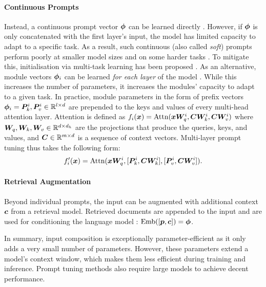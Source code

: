 \documentclass[10pt]{article} %
\begin{document}
\paragraph*{Continuous Prompts} Instead, a continuous prompt vector ${\bm{\phi}}$ can be learned directly  \citep{Lester2021prompttuning,liu2021gpt,zhong-etal-2021-factual,hambardzumyan-etal-2021-warp}. However, if ${\bm{\phi}}$ is only concatenated with the first layer's input, the model has limited capacity to adapt to a specific task. As a result, such continuous (also called \textit{soft}) prompts perform poorly at smaller model sizes and on some harder tasks \citep{Mahabadi2021Compacter,liu-etal-2022-p}. To mitigate this, initialisation via multi-task learning has been proposed \citep{Vu2022spot}. As an alternative, module vectors ${\bm{\phi}}_i$ can be learned \textit{for each layer} of the model \citep[Figure~\ref{fig:nature_modularity:input_composition}; ][]{Li2020PrefixTuning,liu-etal-2022-p}. While this increases the number of parameters, it increases the modules' capacity to adapt to a given task. In practice, module parameters in the form of prefix vectors ${\bm{\phi}}_i = {\bm{P}}_k^i, {\bm{P}}_v^i \in \mathbb{R}^{l \times d}$ are prepended to the keys and values of every multi-head attention layer. Attention is defined as $f_i({\bm{x}}) = \text{Attn}({\bm{x}} {\bm{W}}_q^i, {\bm{C}} {\bm{W}}_k^i, {\bm{C}} {\bm{W}}_v^i)$ where ${\bm{W}}_q, {\bm{W}}_k, {\bm{W}}_v \in \mathbb{R}^{d \times d_h}$ are the projections that produce the queries, keys, and values, and ${\bm{C}} \in \mathbb{R}^{m \times d}$ is a sequence of context vectors. Multi-layer prompt tuning thus takes the following form: 
\begin{equation}
    f_i^\prime({\bm{x}}) = \text{Attn}({\bm{x}} {\bm{W}}_q^i, [{\bm{P}}_k^i, {\bm{C}} {\bm{W}}_k^i], [{\bm{P}}_v^i, {\bm{C}} {\bm{W}}_v^i]).
\end{equation}

\paragraph*{Retrieval Augmentation} Beyond individual prompts, the input can be augmented with additional context ${\bm{c}}$ from a retrieval model. Retrieved documents are appended to the input and are used for conditioning the language model \citep{guu2020retrieval,lewis2020retrieval}: $\text{Emb}([{\bm{p}}, {\bm{c}}]) = {\bm{\phi}}$.

In summary, input composition is exceptionally parameter-efficient as it only adds a very small number of parameters. However, these parameters extend a model's context window, which makes them less efficient during training and inference. Prompt tuning methods also require large models to achieve decent performance.
\end{document}

